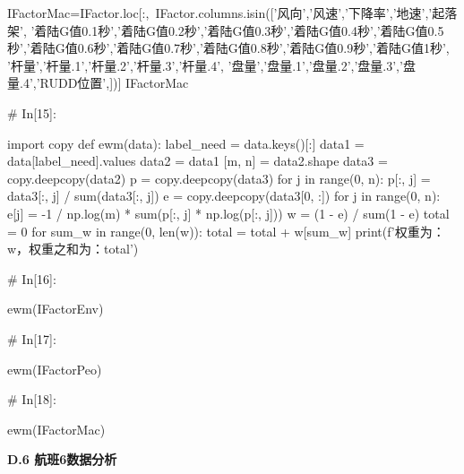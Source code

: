 \documentclass{MathorCupModeling}
\begin{document}
\begin{python}
IFactorMac=IFactor.loc[:,~IFactor.columns.isin(['风向','风速','下降率','地速','起落架',
                          '着陆G值0.1秒','着陆G值0.2秒','着陆G值0.3秒','着陆G值0.4秒','着陆G值0.5秒','着陆G值0.6秒','着陆G值0.7秒','着陆G值0.8秒','着陆G值0.9秒','着陆G值1秒',
                          '杆量','杆量.1','杆量.2','杆量.3','杆量.4',
                          '盘量','盘量.1','盘量.2','盘量.3','盘量.4','RUDD位置',])]
IFactorMac


# In[15]:


import copy
def ewm(data):
    label_need = data.keys()[:]
    data1 = data[label_need].values
    data2 = data1
    [m, n] = data2.shape
    data3 = copy.deepcopy(data2)
    p = copy.deepcopy(data3)
    for j in range(0, n):
        p[:, j] = data3[:, j] / sum(data3[:, j])
    e = copy.deepcopy(data3[0, :])
    for j in range(0, n):
        e[j] = -1 / np.log(m) * sum(p[:, j] * np.log(p[:, j]))
    w = (1 - e) / sum(1 - e)
    total = 0
    for sum_w in range(0, len(w)):
        total = total + w[sum_w]
    print(f'权重为：{w}，权重之和为：{total}')


# In[16]:


ewm(IFactorEnv)


# In[17]:


ewm(IFactorPeo)


# In[18]:


ewm(IFactorMac)


\end{python}
\newpage
\textbf{D.6 航班6数据分析}
\end{document}

